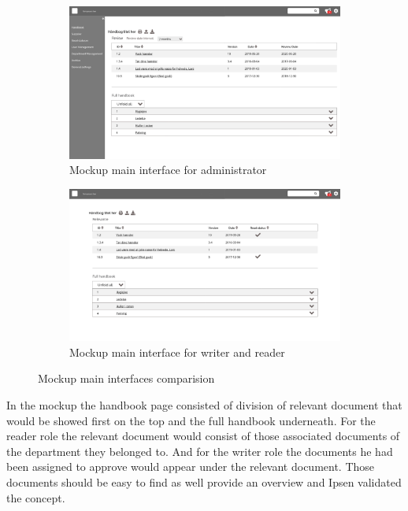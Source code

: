 \begin{figure}[H]
	\centering
	\begin{subfigure}[b]{0.48\textwidth}
		\includegraphics[width=\textwidth]{billeder/ForsideAdmin.jpg}
		\caption{Mockup main interface for administrator}
	\end{subfigure}
	\quad
	\begin{subfigure}[b]{0.48\textwidth}
		\includegraphics[width=\textwidth]{billeder/ForsideWriterReader.jpg}
		\caption{Mockup main interface for writer and reader}
	\end{subfigure}
	\caption{Mockup main interfaces comparision}\label{fig:mockupSidebar}
\end{figure}

In the mockup the handbook page consisted of division of relevant document that would be showed first on the top and the full handbook underneath.
For the reader role the relevant document would consist of those associated documents of the department they belonged to. 
And for the writer role the documents he had been assigned to approve would appear under the relevant document. 
Those documents should be easy to find as well provide an overview and Ipsen validated the concept.

